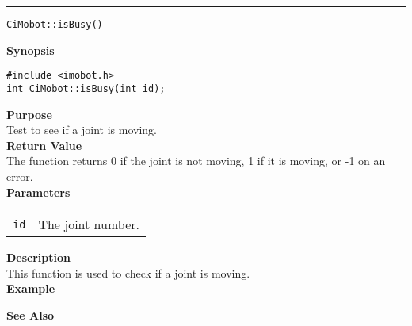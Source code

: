 \noindent
\vspace{5pt}
\rule{6.5in}{0.015in}
\noindent
{\LARGE \texttt{CiMobot::isBusy()}}\\
{}

\noindent
{\bf Synopsis}\\
\begin{verbatim}
#include <imobot.h>
int CiMobot::isBusy(int id);
\end{verbatim}

\noindent
{\bf Purpose}\\
Test to see if a joint is moving.\\

\noindent
{\bf Return Value}\\
The function returns 0 if the joint is not moving, 1 if it is moving, or -1 on an error.\\

\noindent
{\bf Parameters}
\vspace{-0.1in}
\begin{description}
\item               
\begin{tabular}{p{10 mm}p{145 mm}}
\texttt{id} & The joint number. \\
\end{tabular}
\end{description}

\noindent
{\bf Description}\\
This function is used to check if a joint is moving.\\

\noindent
{\bf Example}\\
\noindent

\noindent
{\bf See Also}\\

